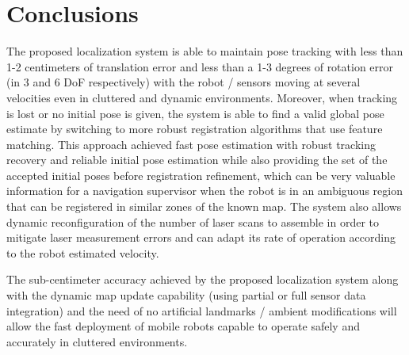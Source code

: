 \section{Conclusions}\label{sec:conclusions}

The proposed localization system is able to maintain pose tracking with less than 1-2 centimeters of translation error and less than a 1-3 degrees of rotation error (in 3 and 6 DoF respectively) with the robot / sensors moving at several velocities even in cluttered and dynamic environments. Moreover, when tracking is lost or no initial pose is given, the system is able to find a valid global pose estimate by switching to more robust registration algorithms that use feature matching. This approach achieved fast pose estimation with robust tracking recovery and reliable initial pose estimation while also providing the set of the accepted initial poses before registration refinement, which can be very valuable information for a navigation supervisor when the robot is in an ambiguous region that can be registered in similar zones of the known map. The system also allows dynamic reconfiguration of the number of laser scans to assemble in order to mitigate laser measurement errors and can adapt its rate of operation according to the robot estimated velocity.

The sub-centimeter accuracy achieved by the proposed localization system along with the dynamic map update capability (using partial or full sensor data integration) and the need of no artificial landmarks / ambient modifications will allow the fast deployment of mobile robots capable to operate safely and accurately in cluttered environments.
